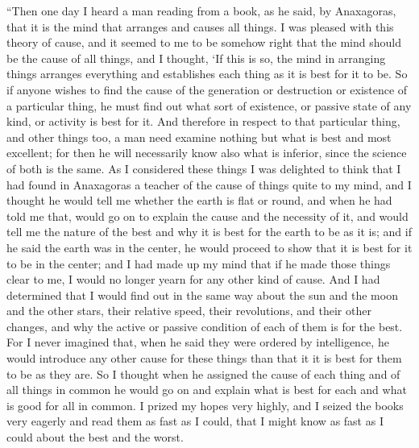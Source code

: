 \documentclass[letterpaper,12pt]{article}
\newcommand{\stephpag}[1]{\marginnote{\small\itshape\fontfamily{ppl}\selectfont #1}}
\begin{document}
\begin{drama}
``Then one day I heard a man reading from a book, as he said, by Anaxagoras, \stephpag{c} that it is the mind that arranges and causes all things. I was pleased with this theory of cause, and it seemed to me to be somehow right that the mind should be the cause of all things, and I thought, `If this is so, the mind in arranging things arranges everything and establishes each thing as it is best for it to be. So if anyone wishes to find the cause of the generation or destruction or existence of a particular thing, he must find out what sort of existence, or passive state of any kind, or activity is best for it. And therefore in respect to \stephpag{d} that particular thing, and other things too, a man need examine nothing but what is best and most excellent; for then he will necessarily know also what is inferior, since the science of both is the same. As I considered these things I was delighted to think that I had found in Anaxagoras a teacher of the cause of things quite to my mind, and I thought he would tell me whether the earth is flat or round, and when \stephpag{e} he had told me that, would go on to explain the cause and the necessity of it, and would tell me the nature of the best and why it is best for the earth to be as it is; and if he said the earth was in the center, he would proceed to show that it is best for it to be in the center; and I had made up my mind that \stephpag{98 a} if he made those things clear to me, I would no longer yearn for any other kind of cause. And I had determined that I would find out in the same way about the sun and the moon and the other stars, their relative speed, their revolutions, and their other changes, and why the active or passive condition of each of them is for the best. For I never imagined that, when he said they were ordered by intelligence, he would introduce any other cause for these things than that it it is best for them to be as they are. \stephpag{b} So I thought when he assigned the cause of each thing and of all things in common he would go on and explain what is best for each and what is good for all in common. I prized my hopes very highly, and I seized the books very eagerly and read them as fast as I could, that I might know as fast as I could about the best and the worst.
 

\end{drama}
\end{document}

